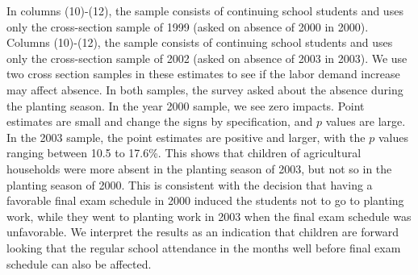 \documentclass[12pt,letterpaper]{article}
\newcommand{\0}{\ensuremath{\mbox{\boldmath $0$}}}
\begin{document}
In columns (10)-(12), the sample consists of continuing school students and uses only the cross-section sample of 1999 (asked on absence of 2000 in 2000). Columns (10)-(12), the sample consists of continuing school students and uses only the cross-section sample of 2002 (asked on absence of 2003 in 2003). We use two cross section samples in these estimates to see if the labor demand increase may affect absence. In both samples, the survey asked about the absence during the planting season. In the year 2000 sample, we see zero impacts. Point estimates are small and change the signs by specification, and $p$ values are large. In the 2003 sample, the point estimates are positive and larger, with the $p$ values ranging between 10.5 to 17.6\%. This shows that children of agricultural households were more absent in the planting season of 2003, but not so in the planting season of 2000. This is consistent with the decision that having a favorable final exam schedule in 2000 induced the students not to go to planting work, while they went to planting work in 2003 when the final exam schedule was unfavorable. We interpret the results as an indication that children are forward looking that the regular school attendance in the months well before final exam schedule can also be affected. 
\end{document}
